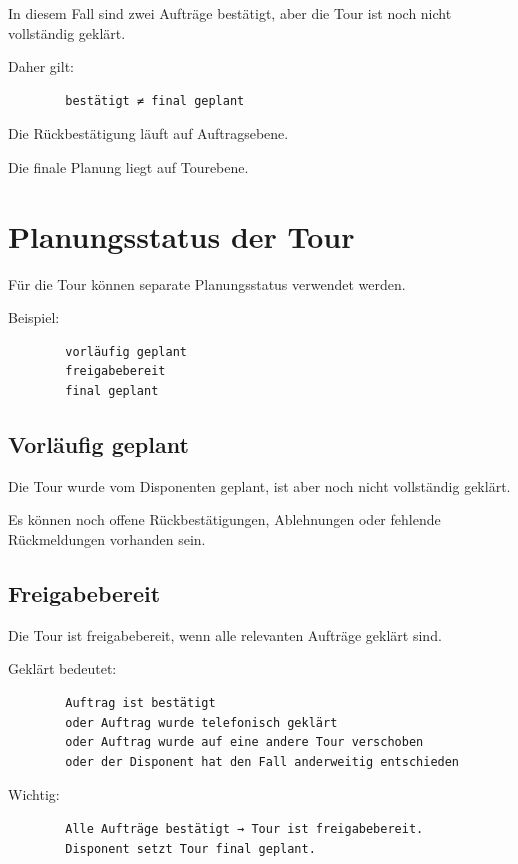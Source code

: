 \documentclass[12pt,a4paper]{article}
\begin{document}
	In diesem Fall sind zwei Aufträge bestätigt, aber die Tour ist noch nicht vollständig geklärt.
	
	Daher gilt:
	
	\begin{lstlisting}
		bestätigt ≠ final geplant
	\end{lstlisting}
	
	Die Rückbestätigung läuft auf Auftragsebene.
	
	Die finale Planung liegt auf Tourebene.
	
	\section{Planungsstatus der Tour}
	
	Für die Tour können separate Planungsstatus verwendet werden.
	
	Beispiel:
	
	\begin{lstlisting}
		vorläufig geplant
		freigabebereit
		final geplant
	\end{lstlisting}
	
	\subsection{Vorläufig geplant}
	
	Die Tour wurde vom Disponenten geplant, ist aber noch nicht vollständig geklärt.
	
	Es können noch offene Rückbestätigungen, Ablehnungen oder fehlende Rückmeldungen vorhanden sein.
	
	\subsection{Freigabebereit}
	
	Die Tour ist freigabebereit, wenn alle relevanten Aufträge geklärt sind.
	
	Geklärt bedeutet:
	
	\begin{lstlisting}
		Auftrag ist bestätigt
		oder Auftrag wurde telefonisch geklärt
		oder Auftrag wurde auf eine andere Tour verschoben
		oder der Disponent hat den Fall anderweitig entschieden
	\end{lstlisting}
	
	Wichtig:
	
	\begin{lstlisting}
		Alle Aufträge bestätigt → Tour ist freigabebereit.
		Disponent setzt Tour final geplant.
	\end{lstlisting}
	
\end{document}
